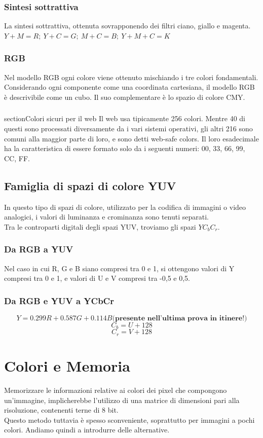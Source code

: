 \documentclass{report}
\begin{document}
	\subsection{Sintesi sottrattiva}
	La sintesi sottrattiva, ottenuta sovrapponendo dei filtri ciano, giallo e magenta.
	$Y+M=R; \ Y + C = G; \ M + C = B; \ Y+M+C = K$
	\subsection{RGB}
	Nel modello RGB ogni colore viene ottenuto mischiando i tre colori fondamentali. Considerando ogni componente come una coordinata cartesiana, il modello RGB è descrivibile come un cubo. Il suo complementare è lo spazio di colore CMY.
	\subsection{}section{Colori sicuri per il web}
	Il web usa tipicamente 256 colori. Mentre 40 di questi sono processati diversamente da i vari sistemi operativi, gli altri 216 sono comuni alla maggior parte di loro, e sono detti web-safe colors.
	Il loro esadecimale ha la caratteristica di essere formato solo da i seguenti numeri: 00, 33, 66, 99, CC, FF.
	\section{Famiglia di spazi di colore YUV}
	In questo tipo di spazi di colore, utilizzato per la codifica di immagini o video analogici, i valori di luminanza e crominanza sono tenuti separati.\\
	Tra le controparti digitali degli spazi YUV, troviamo gli spazi $YC_bC_r$.
	\subsection{Da RGB a YUV}
	Nel caso in cui R, G e B siano compresi tra 0 e 1, si ottengono valori di Y compresi tra 0 e 1, e valori di U e V compresi tra -0,5 e 0,5.
	\subsection{Da RGB e YUV a YCbCr}
	$$
	Y = 0.299R + 0.587G + 0.114B \textbf{(presente nell'ultima prova in itinere!)}
	$$
	$$
	C_b = U + 128
	$$
	$$
	C_r = V + 128
	$$
	\newpage
	\chapter{Colori e Memoria}
	Memorizzare le informazioni relative ai colori dei pixel che compongono \\un'immagine, implicherebbe l'utilizzo di una matrice di dimensioni pari alla risoluzione, contenenti terne di 8 bit. \\
	Questo metodo tuttavia è spesso sconveniente, soprattutto per immagini a pochi colori. Andiamo quindi a introdurre delle alternative.
\end{document}
